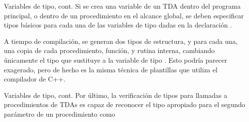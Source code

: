 \begin{frame}{Variables de tipo, cont.}
Si se crea una variable de un TDA dentro del programa principal, o dentro de un procedimiento en el alcance global, se deben especificar tipos básicos para
cada una de las variables de tipo dadas en la declaración .

\typevarr

A tiempo de compilación, se generan dos tipos de estructura, y para cada una, 
una copia de cada procedimiento, función, y rutina interna, cambiando únicamente
el tipo que sustituye a la variable de tipo . Esto podría parecer 
exagerado, pero de hecho es la misma técnica de plantillas que utiliza el 
compilador de C++.
\end{frame}


\begin{frame}{Variables de tipo, cont.}
Por último, la verificación de tipos para llamadas a procedimientos de TDAs 
es capaz de reconocer el tipo apropiado para el segundo parámetro de un procedimiento como

\typevarrr
\end{frame}
